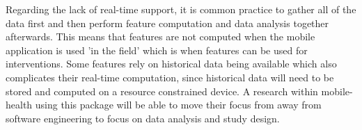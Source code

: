 Regarding the lack of real-time support, it is common practice to gather all of the data first and then perform feature computation and data analysis together afterwards. This means that features are not computed when the mobile application is used 'in the field' which is when features can be used for interventions. Some features rely on historical data being available which also complicates their real-time computation, since historical data will need to be stored and computed on a resource constrained device. A research within mobile-health using this package will be able to move their focus from away from software engineering to focus on data analysis and study design. 